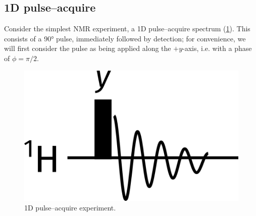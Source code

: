 \subsection{1D pulse--acquire}
\label{subsec:theory__pulseacq}

Consider the simplest NMR experiment, a 1D \proton{} pulse--acquire spectrum (\cref{fig:pulse_acquire}).
This consists of a \ang{90} pulse, immediately followed by detection; for convenience, we will first consider the pulse as being applied along the $+y$-axis, i.e. with a phase of $\phi = \pi/2$.

\begin{figure}[ht]
    \centering
    \label{fig:pulse_acquire}
    \includegraphics[scale=1.2]{./figures/pp/others/zg_on_y.png}
    \caption[Pulse--acquire experiment]{1D \proton{} pulse--acquire experiment.}
\end{figure}


